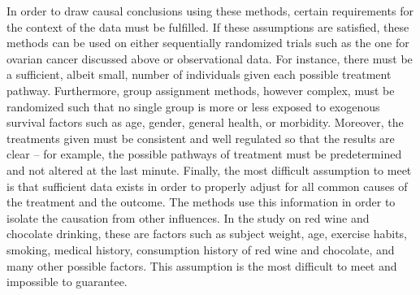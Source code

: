 In order to draw causal conclusions using these methods, certain requirements for the context of the data must be fulfilled.  If these assumptions are satisfied, these methods can be used on either sequentially randomized trials such as the one for ovarian cancer discussed above or observational data.  For instance, there must be a sufficient, albeit small, number of individuals given each possible treatment pathway.  Furthermore, group assignment methods, however complex, must be randomized such that no single group is more or less exposed to exogenous survival factors such as age, gender, general health, or morbidity.  Moreover, the treatments given must be consistent and well regulated so that the results are clear -- for example, the possible pathways of treatment must be predetermined and not altered at the last minute.  Finally, the most difficult assumption to meet is that sufficient data exists in order to properly adjust for all common causes of the treatment and the outcome.  The methods use this information in order to isolate the causation from other influences.  In the study on red wine and chocolate drinking, these are factors such as subject weight, age, exercise habits, smoking, medical history, consumption history of red wine and chocolate, and many other possible factors.  This assumption is the most difficult to meet and impossible to guarantee.  
  
